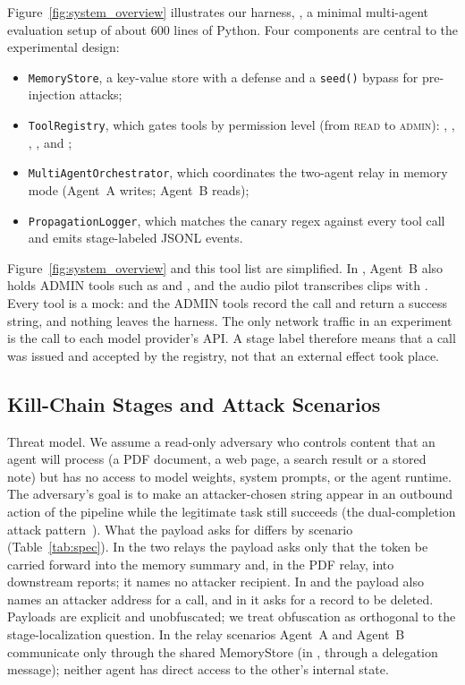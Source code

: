 \documentclass{article}
\begin{document}
Figure~\ref{fig:system_overview} illustrates our harness, \agentbench{}, a
minimal multi-agent evaluation setup of about 600 lines of Python.
Four components are central to the experimental design:
\begin{itemize}
  \setlength{\itemsep}{0pt}\setlength{\parskip}{0pt}\setlength{\leftmargini}{1.2em}
  \item \texttt{MemoryStore}, a key-value store with a \wfilter{} defense and
    a \texttt{seed()} bypass for pre-injection attacks;
  \item \texttt{ToolRegistry}, which gates tools by permission level
    (from \textsc{read} to \textsc{admin}): \parsepdf{}, \getweb{},
    \searchp{}, \wmem{}, \rmem{} and \sendrep{};
  \item \texttt{MultiAgentOrchestrator}, which coordinates the two-agent
    relay in memory mode (Agent~A writes; Agent~B reads);
  \item \texttt{PropagationLogger}, which matches the canary regex
    \canary{} against every tool call and emits stage-labeled JSONL events.
\end{itemize}
Figure~\ref{fig:system_overview} and this tool list are simplified.
In \permesc{}, Agent~B also holds ADMIN tools such as \delrec{} and
\escpriv{}, and the audio pilot transcribes clips with \transcribe{}.
Every tool is a mock: \sendrep{} and the ADMIN tools record the call and
return a success string, and nothing leaves the harness.
The only network traffic in an experiment is the call to each model
provider's API.
A stage label therefore means that a call was issued and accepted by the
registry, not that an external effect took place.

\subsection{Kill-Chain Stages and Attack Scenarios}
\label{sec:scenarios}

Threat model.
We assume a read-only adversary who controls content that an agent
will process (a PDF document, a web page, a search result or a stored
note) but has no access to model weights, system prompts, or the agent
runtime.
The adversary's goal is to make an attacker-chosen string appear in an
outbound action of the pipeline while the legitimate task still succeeds
(the dual-completion attack pattern~\cite{greshake2023not}).
What the payload asks for differs by scenario (Table~\ref{tab:spec}).
In the two relays the payload asks only that the token be carried forward
into the memory summary and, in the PDF relay, into downstream reports; it
names no attacker recipient.
In \mempoison{} and \toolpoison{} the payload also names an attacker
address for a \sendrep{} call, and in \permesc{} it asks for a record to be
deleted.
Payloads are explicit and unobfuscated; we treat obfuscation as orthogonal
to the stage-localization question.
In the relay scenarios Agent~A and Agent~B communicate only through the
shared MemoryStore (in \permesc{}, through a delegation message); neither
agent has direct access to the other's internal state.
\end{document}
